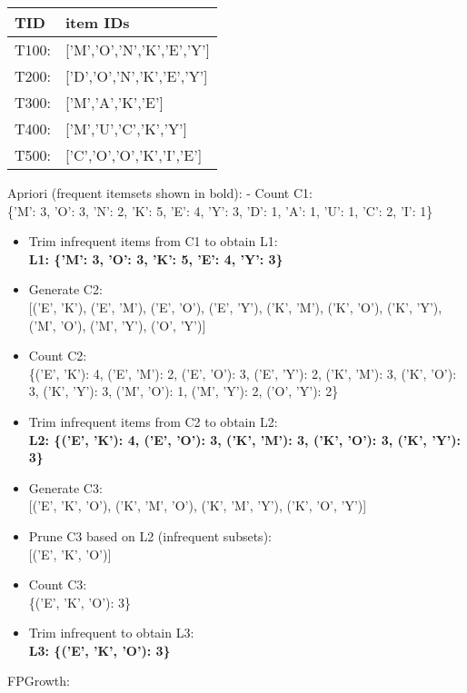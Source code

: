 \documentclass[11pt]{article}
\begin{document}
    \begin{longtable}[]{@{}ll@{}}
\toprule
TID & item IDs\tabularnewline
\midrule
\endhead
T100: & {[}'M','O','N','K','E','Y'{]}\tabularnewline
T200: & {[}'D','O','N','K','E','Y'{]}\tabularnewline
T300: & {[}'M','A','K','E'{]}\tabularnewline
T400: & {[}'M','U','C','K','Y'{]}\tabularnewline
T500: & {[}'C','O','O','K','I','E'{]}\tabularnewline
\bottomrule
\end{longtable}

    Apriori (frequent itemsets shown in bold): - Count C1:\\
\{'M': 3, 'O': 3, 'N': 2, 'K': 5, 'E': 4, 'Y': 3, 'D': 1, 'A': 1, 'U':
1, 'C': 2, 'I': 1\}

\begin{itemize}
\item
  Trim infrequent items from C1 to obtain L1:\\
  \textbf{L1: \{'M': 3, 'O': 3, 'K': 5, 'E': 4, 'Y': 3\}}
\item
  Generate C2:\\
  {[}('E', 'K'), ('E', 'M'), ('E', 'O'), ('E', 'Y'), ('K', 'M'), ('K',
  'O'), ('K', 'Y'), ('M', 'O'), ('M', 'Y'), ('O', 'Y'){]}
\item
  Count C2:\\
  \{('E', 'K'): 4, ('E', 'M'): 2, ('E', 'O'): 3, ('E', 'Y'): 2, ('K',
  'M'): 3, ('K', 'O'): 3, ('K', 'Y'): 3, ('M', 'O'): 1, ('M', 'Y'): 2,
  ('O', 'Y'): 2\}
\item
  Trim infrequent items from C2 to obtain L2:\\
  \textbf{L2: \{('E', 'K'): 4, ('E', 'O'): 3, ('K', 'M'): 3, ('K', 'O'):
  3, ('K', 'Y'): 3\}}
\item
  Generate C3:\\
  {[}('E', 'K', 'O'), ('K', 'M', 'O'), ('K', 'M', 'Y'), ('K', 'O',
  'Y'){]}
\item
  Prune C3 based on L2 (infrequent subsets):\\
  {[}('E', 'K', 'O'){]}
\item
  Count C3:\\
  \{('E', 'K', 'O'): 3\}
\item
  Trim infrequent to obtain L3:\\
  \textbf{L3: \{('E', 'K', 'O'): 3\}}
\end{itemize}

    FPGrowth:
\end{document}
